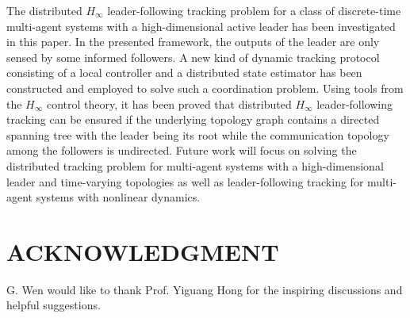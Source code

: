\documentclass[a4paper,10pt,onecolumn]{article}
\begin{document}
The distributed $H_{\infty}$ leader-following tracking problem for a class of
discrete-time multi-agent systems with a high-dimensional active leader has been investigated in this paper. In the
presented framework, the outputs of the leader are only sensed by some
informed followers. A new kind of dynamic tracking protocol consisting of a
local controller and a distributed state estimator has been constructed and
employed to solve such a coordination problem. Using tools from the $H_{\infty}$
control theory, it has been proved that distributed $H_{\infty}$
leader-following tracking can be ensured if the underlying topology graph
contains a directed spanning tree with the leader being its root while the
communication topology among the followers is undirected. Future work will
focus on solving the distributed 
tracking problem for multi-agent systems with a high-dimensional leader and
time-varying topologies as well as leader-following tracking for multi-agent
systems with nonlinear dynamics.

\addtolength{\textheight}{-12cm}   











\section*{ACKNOWLEDGMENT}
G. Wen would like to thank Prof. Yiguang Hong for the inspiring discussions
and helpful suggestions.
\end{document}
